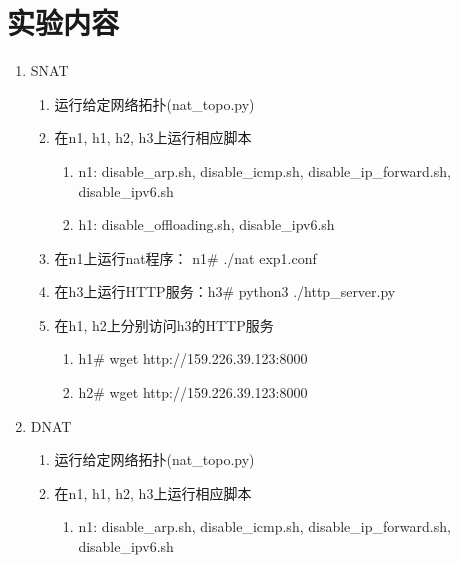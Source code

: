 \documentclass[UTF8]{report}
\begin{document}
\pagestyle{fancy}

\maketitle

\section{实验内容}

\begin{enumerate}
    \item SNAT
    \begin{enumerate}
        \item 运行给定网络拓扑(nat_topo.py)
        \item 在n1, h1, h2, h3上运行相应脚本
        \begin{enumerate}
            \item n1: disable_arp.sh, disable_icmp.sh, disable_ip_forward.sh, disable_ipv6.sh
            \item h1: disable_offloading.sh, disable_ipv6.sh
        \end{enumerate}
        \item 在n1上运行nat程序：  n1\# ./nat exp1.conf
        \item 在h3上运行HTTP服务：h3\# python3 ./http_server.py
        \item 在h1, h2上分别访问h3的HTTP服务
        \begin{enumerate}
            \item h1\# wget http://159.226.39.123:8000
            \item h2\# wget http://159.226.39.123:8000
        \end{enumerate}
    \end{enumerate}
    \item DNAT
    \begin{enumerate}
        \item 运行给定网络拓扑(nat_topo.py)
        \item 在n1, h1, h2, h3上运行相应脚本
        \begin{enumerate}
            \item n1: disable_arp.sh, disable_icmp.sh, disable_ip_forward.sh, disable_ipv6.sh

\end{enumerate}
\end{enumerate}
\end{enumerate}
\end{document}
